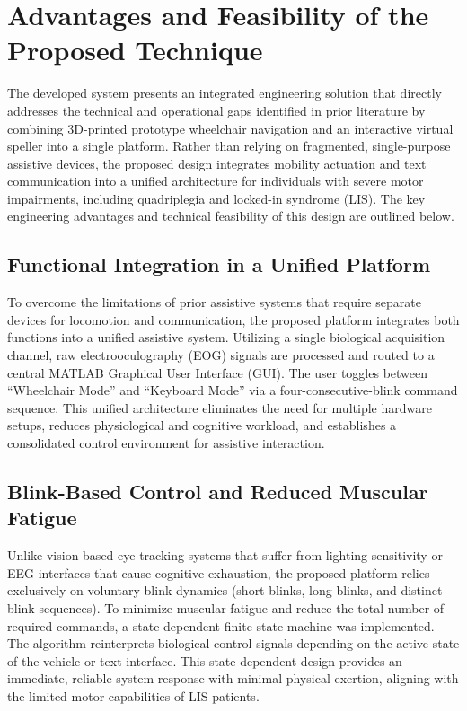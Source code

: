 \section{Advantages and Feasibility of the Proposed Technique}
\label{sec:advantages_proposed_technique}

The developed system presents an integrated engineering solution that directly addresses the technical and operational gaps identified in prior literature by combining 3D-printed prototype wheelchair navigation and an interactive virtual speller into a single platform. Rather than relying on fragmented, single-purpose assistive devices, the proposed design integrates mobility actuation and text communication into a unified architecture for individuals with severe motor impairments, including quadriplegia and locked-in syndrome (LIS). The key engineering advantages and technical feasibility of this design are outlined below.

\subsection{Functional Integration in a Unified Platform}
\label{subsec:functional_integration}

To overcome the limitations of prior assistive systems that require separate devices for locomotion and communication, the proposed platform integrates both functions into a unified assistive system. Utilizing a single biological acquisition channel, raw electrooculography (EOG) signals are processed and routed to a central MATLAB Graphical User Interface (GUI). The user toggles between ``Wheelchair Mode'' and ``Keyboard Mode'' via a four-consecutive-blink command sequence. This unified architecture eliminates the need for multiple hardware setups, reduces physiological and cognitive workload, and establishes a consolidated control environment for assistive interaction.

\subsection{Blink-Based Control and Reduced Muscular Fatigue}
\label{subsec:blink_based_control}

Unlike vision-based eye-tracking systems that suffer from lighting sensitivity or EEG interfaces that cause cognitive exhaustion, the proposed platform relies exclusively on voluntary blink dynamics (short blinks, long blinks, and distinct blink sequences). To minimize muscular fatigue and reduce the total number of required commands, a state-dependent finite state machine was implemented. The algorithm reinterprets biological control signals depending on the active state of the vehicle or text interface. This state-dependent design provides an immediate, reliable system response with minimal physical exertion, aligning with the limited motor capabilities of LIS patients.

